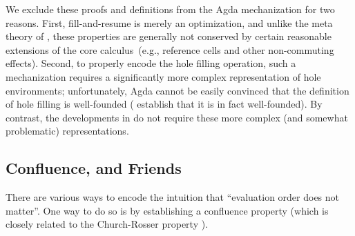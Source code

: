 We exclude these proofs and definitions from the Agda mechanization
for two reasons.
%
First, fill-and-resume is merely an optimization, and unlike the meta
theory of , these properties are generally not
conserved by certain reasonable extensions of the core
calculus~(e.g., reference cells and other non-commuting effects).
%
Second, to properly encode the hole filling operation, such a
mechanization requires a significantly more complex representation of
hole environments; unfortunately, Agda cannot be easily convinced that
the definition of hole filling is well-founded (\citet{Nanevski2008}
establish that it is in fact well-founded).
%
By contrast, the developments in  do not require
these more complex (and somewhat problematic) representations.


\subsection{Confluence, and Friends}\label{sec:confluence}
There are various ways to encode the intuition that ``evaluation order does not matter''. One way to do so is
by establishing a confluence property (which is closely related to
the Church-Rosser property \cite{church1936some}).

